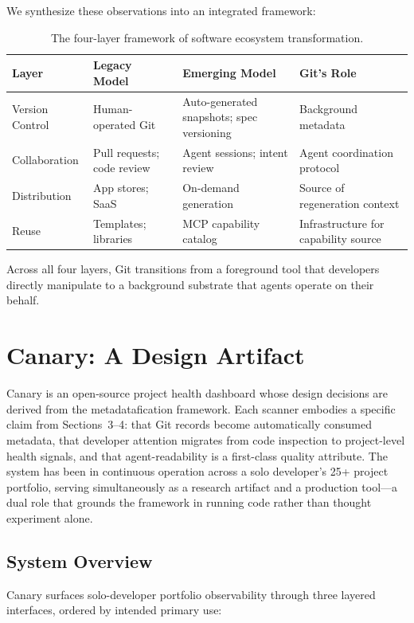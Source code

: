 \documentclass[12pt]{article}
\begin{document}
We synthesize these observations into an integrated framework:

\begin{table}[h]
\centering
\small
\begin{tabularx}{\textwidth}{lXXX}
\toprule
\textbf{Layer} & \textbf{Legacy Model} & \textbf{Emerging Model} & \textbf{Git's Role} \\
\midrule
Version Control & Human-operated Git & Auto-generated snapshots; spec versioning & Background metadata \\
Collaboration & Pull requests; code review & Agent sessions; intent review & Agent coordination protocol \\
Distribution & App stores; SaaS & On-demand generation & Source of regeneration context \\
Reuse & Templates; libraries & MCP capability catalog & Infrastructure for capability source \\
\bottomrule
\end{tabularx}
\caption{The four-layer framework of software ecosystem transformation.}
\label{tab:framework}
\end{table}

Across all four layers, Git transitions from a foreground tool that developers directly manipulate to a background substrate that agents operate on their behalf.

\section{Canary: A Design Artifact}

Canary is an open-source project health dashboard whose design decisions are derived from the metadatafication framework. Each scanner embodies a specific claim from Sections~3--4: that Git records become automatically consumed metadata, that developer attention migrates from code inspection to project-level health signals, and that agent-readability is a first-class quality attribute. The system has been in continuous operation across a solo developer's 25+ project portfolio, serving simultaneously as a research artifact and a production tool---a dual role that grounds the framework in running code rather than thought experiment alone.

\subsection{System Overview}

Canary surfaces solo-developer portfolio observability through three layered interfaces, ordered by intended primary use:
\end{document}
